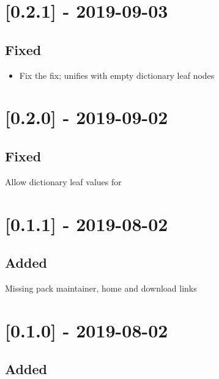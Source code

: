 \section{[0.2.1] - 2019-09-03}

\subsection{Fixed}

\begin{itemize}
    \item Fix the fix;  unifies with empty dictionary leaf nodes
\end{itemize}

\section{[0.2.0] - 2019-09-02}

\subsection{Fixed}

\begin{shortlist}
    \item Allow dictionary leaf values for 
\end{shortlist}

\section{[0.1.1] - 2019-08-02}

\subsection{Added}

\begin{shortlist}
    \item Missing pack maintainer, home and download links
\end{shortlist}

\section{[0.1.0] - 2019-08-02}

\subsection{Added}

